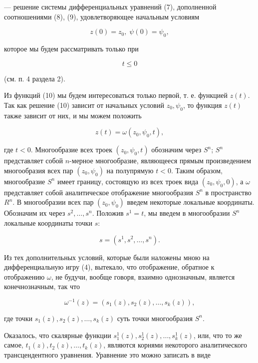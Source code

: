 \documentclass[10pt]{article}
\begin{document}
— решение системы дифференциальных уравнений (7), дополненной соотношениями (8), (9), удовлетворяющее начальным условиям

\[
z\left( 0\right)  = {z}_{0},\;\psi \left( 0\right)  = {\psi }_{0}, \tag{11}
\]

которое мы будем рассматривать только при

\[
t \leq  0 \tag{12}
\]

(см. п. 4 раздела 2).

Из функций (10) мы будем интересоваться только первой, т. е. функцией \(z\left( t\right)\). Так как решение (10) зависит от начальных условий \({z}_{0},{\psi }_{0}\), то функция \(z\left( t\right)\) также зависит от них, и мы можем положить

\[
z\left( t\right)  = \omega \left( {{z}_{0},{\psi }_{0},t}\right), \tag{13}
\]

где \(t < 0\). Многообразие всех троек \(\left( {{z}_{0},{\psi }_{0},t}\right)\) обозначим через \({S}^{n}\); \({S}^{n}\) представляет собой \(n\)-мерное многообразие, являющееся прямым произведением многообразия всех пар \(\left( {{z}_{0},{\psi }_{0}}\right)\) на полупрямую \(t < 0\). Таким образом, многообразие \({S}^{n}\) имеет границу, состоящую из всех троек вида \(\left( {{z}_{0},{\psi }_{0},0}\right)\), а \(\omega\) представляет собой аналитическое отображение многообразия \({S}^{n}\) в пространство \({R}^{n}\). В многообразии всех пар \(\left( {{z}_{0},{\psi }_{0}}\right)\) введем некоторые локальные координаты. Обозначим их через \({s}^{2},\ldots,{s}^{n}\). Положив \({s}^{1} = t\), мы введем в многообразии \({S}^{n}\) локальные координаты точки \(s\):

\[
s = \left( {{s}^{1},{s}^{2},\ldots,{s}^{n}}\right). \tag{14}
\]

Из тех дополнительных условий, которые были наложены мною на дифференциальную игру (4), вытекало, что отображение, обратное к отображению \(\omega\), не будучи, вообще говоря, взаимно однозначным, является конечнозначным, так что

\[
{\omega }^{-1}\left( z\right)  = \left( {{s}_{1}\left( z\right),{s}_{2}\left( z\right),\ldots,{s}_{k}\left( z\right) }\right),
\]

где точки \({s}_{1}\left( z\right),{s}_{2}\left( z\right),\ldots,{s}_{k}\left( z\right)\) суть точки многообразия \({S}^{n}\).

Оказалось, что скалярные функции \({s}_{1}^{1}\left( z\right),{s}_{2}^{1}\left( z\right),\ldots,{s}_{k}^{1}\left( z\right)\), или, что то же самое, \({t}_{1}\left( z\right),{t}_{2}\left( z\right),\ldots,{t}_{k}\left( z\right)\), являются корнями некоторого аналитического трансцендентного уравнения. Уравнение это можно записать в виде
\end{document}
